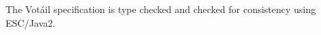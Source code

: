 \documentclass[letterpaper,twocolumn,10pt]{article}
\newcommand{\Votail}{Vot{\'a}il\xspace}
\begin{document}
% 
% 
% 

The \Votail specification is type checked and checked for consistency
using ESC/Java2.

\end{document}
